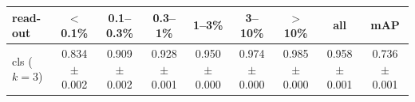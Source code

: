 \begin{tabular}{lcccccccc}
\toprule
read-out & $<$0.1\% & 0.1--0.3\% & 0.3--1\% & 1--3\% & 3--10\% & $>$10\% & all & mAP \\
\midrule
cls ($k=3$) & 0.834 $\pm$ 0.002 & 0.909 $\pm$ 0.002 & 0.928 $\pm$ 0.001 & 0.950 $\pm$ 0.000 & 0.974 $\pm$ 0.000 & 0.985 $\pm$ 0.000 & 0.958 $\pm$ 0.001 & 0.736 $\pm$ 0.001 \\
\bottomrule
\end{tabular}
